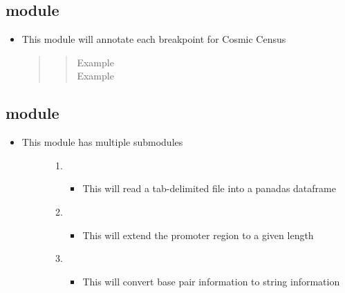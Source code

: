\documentclass[letterpaper,10pt,english]{sphinxmanual}
\begin{document}
\subsection{ module}
\label{\detokenize{iAnnotateSV:annotateforcosmic-module}}\begin{itemize}
\item {} 
This module will annotate each breakpoint for Cosmic Census
\begin{quote}
\begin{quote}\begin{description}
\item[{Example}] \leavevmode
{}

\item[{Example}] \leavevmode
{}

\end{description}\end{quote}
\end{quote}

\end{itemize}


\subsection{ module}
\label{\detokenize{iAnnotateSV:helper-module}}\begin{itemize}
\item {} \begin{description}
\item[{This module has multiple submodules}] \leavevmode\begin{enumerate}
\item {} 
\begin{itemize}
\item {} 
This will read a tab-delimited file into a panadas dataframe

\end{itemize}

\item {} 
\begin{itemize}
\item {} 
This will extend the promoter region to a given length

\end{itemize}

\item {} 
\begin{itemize}
\item {} 
This will convert base pair information to string information

\end{itemize}

\end{enumerate}

\end{description}

\end{itemize}
\end{document}
